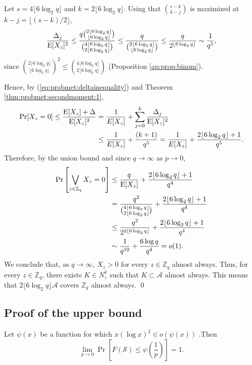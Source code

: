 Let $s = 4\lfloor 6 \log_2 q \rfloor$ and $k = 2\lfloor 6 \log_2 q \rfloor$. Using that $\binom{s - k}{k - j}$ is maximized at $k - j = \lfloor (s - k) / 2\rfloor$,
\begin{align*}
\frac{\Delta_j}{\mathrm{E}[X_z]^2} \leq \frac{q \binom{2\lfloor 6 \log_2 q \rfloor}{\lfloor 6 \log_2 q \rfloor}}{\binom{4\lfloor 6 \log_2 q \rfloor}{2\lfloor 6 \log_2 q \rfloor}} \leq \frac{q}{\binom{2\lfloor 6 \log_2 q \rfloor }{ \lfloor 6 \log_2 q \rfloor}} \leq \frac{q}{2^{\lfloor 6 \log_2 q \rfloor}} \sim \frac{1}{q^5},
\end{align*}
since \(\binom{2\lfloor 6 \log_2 q \rfloor}{\lfloor 6 \log_2 q \rfloor}^2 \leq \binom{4\lfloor 6 \log_2 q \rfloor }{2\lfloor 6 \log_2 q \rfloor}\) (Proposition \ref{ap:prop:binom}).   \par
Hence, by (\ref{eq:probmet:deltainequality}) and Theorem \ref{thm:probmet:secondmoment:1},
\begin{align*}
\mathrm{Pr}[X_z = 0] \leq \frac{\mathrm{E}[X_z] + \Delta}{\mathrm{E}[X_z]^2} &= \frac{1}{E[X_z]} + \sum_{j = 0}^k \frac{\Delta_j}{\mathrm{E}[X_z]^2} \\
&\leq \frac{1}{E[X_z]} + \frac{(k + 1)}{q^5} = \frac{1}{E[X_z]} + \frac{2\lfloor 6 \log_2 q\rfloor + 1}{q^5}.
\end{align*}
Therefore, by the union bound and since $q \to \infty$ as $p \to 0$,
\begin{align}
\mathrm{Pr}\left[\bigvee_{z \in \mathbb{Z}_q} X_z = 0\right] &\leq \frac{q}{\mathrm{E}[X_z]} + \frac{2\lfloor 6 \log_2 q \rfloor + 1}{q^4}\\
 &= \frac{q^2}{\binom{4\lfloor 6 \log_2 q \rfloor}{2\lfloor 6 \log_2 q \rfloor}} + \frac{2\lfloor 6 \log_2 q \rfloor + 1}{q^4} \\
 &\leq \frac{q^2}{2^{2\lfloor 6 \log_2 q \rfloor}} + \frac{2\lfloor 6 \log_2 q \rfloor + 1}{q^4} \\
 &\sim \frac{1}{q^{10}} + \frac{6\log q}{q^4}= o(1).\label{eq:lemma:prob}
\end{align}
We conclude that, as $q \to \infty$, $X_z > 0$ for every $z \in \mathbb{Z}_q$ almost always. Thus, for every $z \in \mathbb{Z}_q$, there exists $K \in N_z^k$ such that $K \subset \mathcal{A}$ almost always. This means that $2\lfloor 6 \log_2 q \rfloor \mathcal{A}$ covers $\mathbb{Z}_q$ almost always. \qed

\subsection{Proof of the upper bound} 
\begin{lemma}\label{lem:upperbound}
    Let $\psi(x)$ be a function for which $x(\log x)^2 \in o(\psi(x))$ .Then
    \[\lim_{p \to 0}\Pr\left[F(\mathcal{S}) \leq \psi\left(\frac{1}{p}\right)\right] = 1.\] 
\end{lemma}

